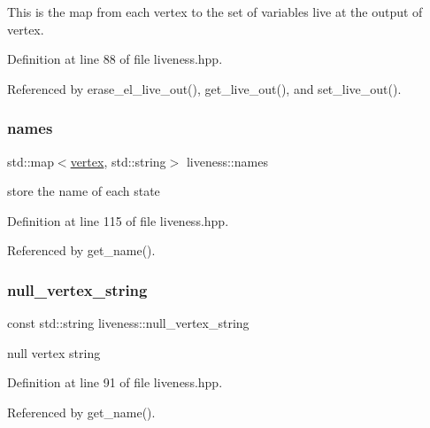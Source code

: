 This is the map from each vertex to the set of variables live at the output of vertex. 



Definition at line 88 of file liveness.\+hpp.



Referenced by erase\+\_\+el\+\_\+live\+\_\+out(), get\+\_\+live\+\_\+out(), and set\+\_\+live\+\_\+out().

\mbox{\label{classliveness_aa770d60851e188464b2768027804c3bb}} 
\subsubsection{\texorpdfstring{names}{names}}
{\footnotesize\ttfamily std\+::map$<$\hyperlink{graph_8hpp_abefdcf0544e601805af44eca032cca14}{vertex}, std\+::string$>$ liveness\+::names\hspace{0.3cm}{\ttfamily [private]}}



store the name of each state 



Definition at line 115 of file liveness.\+hpp.



Referenced by get\+\_\+name().

\mbox{\label{classliveness_a02ac2fe52cfae579f3114eee285a7500}} 
\subsubsection{\texorpdfstring{null\+\_\+vertex\+\_\+string}{null\_vertex\_string}}
{\footnotesize\ttfamily const std\+::string liveness\+::null\+\_\+vertex\+\_\+string\hspace{0.3cm}{\ttfamily [private]}}



null vertex string 



Definition at line 91 of file liveness.\+hpp.



Referenced by get\+\_\+name().

\mbox{\label{classliveness_a2b88b050331ff347cbb910b885cff259}} 
